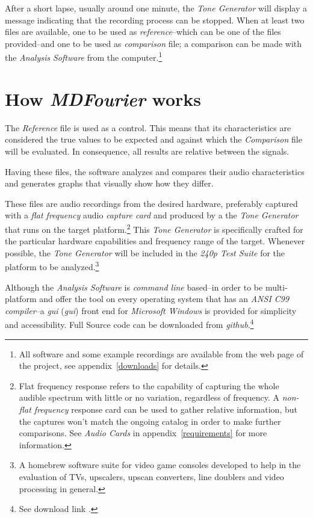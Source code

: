 \documentclass[10pt,a4paper]{report}
\newcommand{\define}[1]{\textit{\acrlong{#1}} (\textit{\acrshort{#1}})}
\begin{document}
After a short lapse, usually around one minute, the \textit{Tone Generator} will display a message indicating that the recording process can be stopped. When at least two files are available, one to be used as \textit{reference}--which can be one of the files provided--and one to be used as \textit{comparison} file; a comparison can be made with the \textit{Analysis Software} from the computer.\footnote{All software and some example recordings are available from the web page of the project, see appendix~\ref{downloads} for details.}

\section{How \textit{MDFourier} works}

The \textit{Reference} file is used as a control. This means that its characteristics are considered the true values to be expected and against which the \textit{Comparison} file will be evaluated. In consequence, all results are relative between the signals.

Having these files, the software analyzes and compares their audio characteristics and generates graphs that visually show how they differ.

These files are audio recordings from the desired hardware, preferably captured with a \textit{flat frequency} audio \textit{capture card} and produced by a the \textit{Tone Generator} that runs on the target platform.\footnote{Flat frequency response refers to the capability of capturing the whole audible spectrum with little or no variation, regardless of frequency. A \textit{non-flat frequency} response card can be used to gather relative information, but the captures won't match the ongoing catalog in order to make further comparisons. See \textit{Audio Cards} in appendix~\ref{requirements} for more information.} This \textit{Tone Generator} is specifically crafted for the particular hardware capabilities and frequency range of the target. Whenever possible, the \textit{Tone Generator} will be included in the \textit{240p Test Suite} for the platform to be analyzed.\footnote{A homebrew software suite for video game consoles developed to help in the evaluation of TVs, upscalers, upscan converters, line doublers and video processing in general.\cite{240pSuite}}

Although the \textit{Analysis Software} is \textit{command line} based--in order to be multi-platform and offer the tool on every operating system that has an \textit{ANSI C99 compiler}--a \define{gui} front end for \textit{Microsoft Windows} is provided for simplicity and accessibility. Full Source code can be downloaded from \textit{github}.\footnote{See download link \cite{sourcecode}.}
\end{document}
